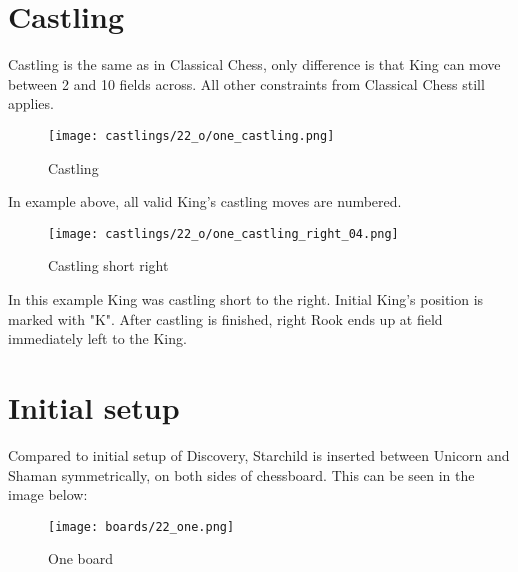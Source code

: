 \section*{Castling}

Castling is the same as in Classical Chess, only difference is that King can move between 2 and 10 fields across.
All other constraints from Classical Chess still applies.

\noindent
\begin{figure}[!h]
\texttt{[image: castlings/22\_o/one\_castling.png]}
\caption{Castling}
\label{fig:one_castling}
\end{figure}

In example above, all valid King's castling moves are numbered.

\noindent
\begin{figure}[!h]
\texttt{[image: castlings/22\_o/one\_castling\_right\_04.png]}
\caption{Castling short right}
\label{fig:one_castling_right_04}
\end{figure}

In this example King was castling short to the right. Initial King's position is marked with "K".
After castling is finished, right Rook ends up at field immediately left to the King.

\clearpage %

\section*{Initial setup}

Compared to initial setup of Discovery, Starchild is inserted between Unicorn and Shaman
symmetrically, on both sides of chessboard. This can be seen in the image below:

\noindent
\begin{figure}[h]
\texttt{[image: boards/22\_one.png]}
\caption{One board}
\label{fig:22_one}
\end{figure}

\clearpage %
